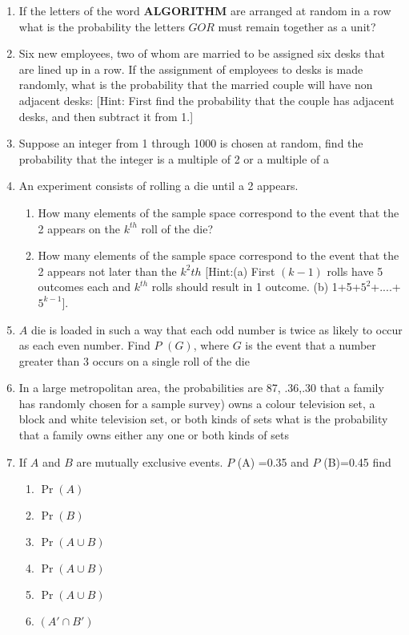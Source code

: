 \documentclass[12pt]{article}
\providecommand{\pr}[1]{\ensuremath{\Pr\left(#1\right)}}
\begin{document}
\begin{enumerate}
\item If the letters of the word \textbf{ALGORITHM} are arranged at random in a row what is the probability the letters $GOR$ must remain together as a unit?	
\item Six new employees, two of whom are married to be assigned six desks that are lined up in a row. If the assignment of employees to desks is made randomly, what is the probability that the married couple will have non adjacent desks:
[Hint: First find the probability that the couple has adjacent desks, and then subtract it from 1.]
\item Suppose an integer from 1 through 1000 is chosen at random, find the probability that the integer is a multiple of 2 or a multiple of a
\item An experiment consists of rolling a die until a 2 appears.
\begin{enumerate}
\item How many elements of the sample space correspond to the event that the 2 appears on the $k^{th}$ roll of the die?
\item How many elements of the sample space correspond to the event that the 2 appears not later than the $k^2{th}$	
[Hint:(a) First $(k-1)$ rolls have 5 outcomes each and $k^{th}$ rolls should result in 1 outcome. (b) 1+5+$5^2$+....+$5^{k-1}$].
\end{enumerate}
\item $A$ die is loaded in such a way that each odd number is twice as likely to occur as each even number. Find $P$ $(G)$, where $G$ is the event that a number greater than 3 occurs on a  single roll of the die
\item In a large metropolitan area, the probabilities are 87, .36,.30 that a family has randomly chosen for a sample survey) owns a colour television set, a block and white television set, or both kinds of sets what is the probability that a family owns either any one or both kinds of sets
\item  If $A$ and $B$ are mutually exclusive events. $P$ (A) =0.35 and $P$ (B)=0.45 find
	\begin{enumerate}	
\item $\pr{A}$
\item $\pr{B}$
\item $\pr{A\cup B}$
\item $\pr{A\cup B}$
\item $\pr{A \cup  B}$ 
\item $(A\prime\cap B\prime)$

\end{enumerate}
\end{enumerate}
\end{document}
